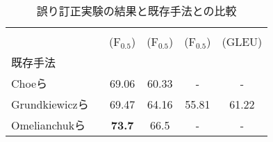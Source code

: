 \documentclass[
  platex, dvipdfmx %
]{nlp2021}
\begin{document}
\begin{table}[t]
	\centering
	\small
	\tabcolsep 6pt
	\caption{誤り訂正実験の結果と既存手法との比較}
	\label{tab:result}
	\begin{tabular}{lcccc}
		\hline
		& \hspace{-2em}{$\def\arraystretch{0.5}\begin{array}{c}\vspace{-0.5em}\\\text{BEA-19}\\\text{test}\\\end{array}$}\hspace{-2em}
		& \hspace{-2em}{$\def\arraystretch{0.5}\begin{array}{c}\vspace{-0.5em}\\\text{CoNLL}\\\text{14}\\\end{array}$}\hspace{-2em}
		& \hspace{-2em}{$\def\arraystretch{0.5}\begin{array}{c}\vspace{-0.5em}\\\text{FCE}\\\text{test}\\\end{array}$}\hspace{-2em}
		& \hspace{-2em}{$\def\arraystretch{0.5}\begin{array}{c}\vspace{-0.5em}\\\text{JFLEG}\\\text{test}\\\end{array}$}\hspace{-2em}
		\\
		& (F${}_{0.5}$)
		& (F${}_{0.5}$)
		& (F${}_{0.5}$)
		& (GLEU)
		\\
		\hline
		\hline
		既存手法 \\
		Choeら ~\cite{choe-etal-2019-neural}
		& 69.06 & 60.33 & - & - \\
		Grundkiewiczら ~\cite{grundkiewicz-etal-2019-neural}
		& 69.47 & 64.16 & 55.81 & 61.22 \\
		Omelianchukら ~\cite{omelianchuk-etal-2020-gector}
		& \textbf{73.7} & 66.5 & - & - \\

\end{tabular}
\end{table}
\end{document}
